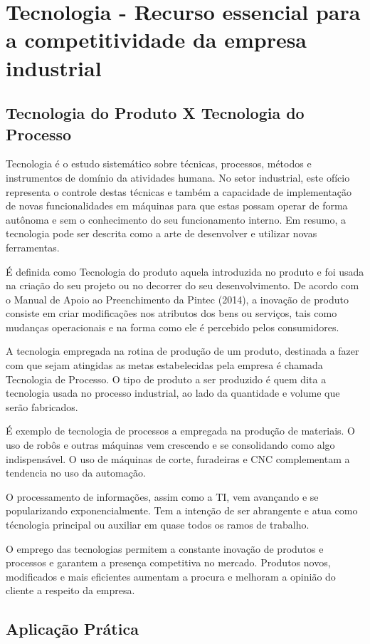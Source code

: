 \chapter{Tecnologia - Recurso essencial para a competitividade da empresa industrial} 
\label{chap:tecnologia_recurso} 

\section{Tecnologia do Produto X Tecnologia do Processo} 
\label{sec:tecnologia_prod_process} 
  Tecnologia é o estudo sistemático sobre técnicas, processos, métodos e instrumentos de domínio da atividades humana. No setor industrial, este ofício representa o controle destas técnicas e também a capacidade de implementação de novas funcionalidades em máquinas para que estas possam operar de forma autônoma e sem o conhecimento do seu funcionamento interno. Em resumo, a tecnologia pode ser descrita como a arte de desenvolver e utilizar novas ferramentas.

  É definida como Tecnologia do produto aquela introduzida no produto e foi usada na criação do seu projeto ou no decorrer do seu desenvolvimento. De acordo com o Manual de Apoio ao Preenchimento da Pintec (2014), a inovação de produto consiste em criar modificações nos atributos dos bens ou serviços, tais como mudanças operacionais e na forma como ele é percebido pelos consumidores.

  A tecnologia empregada na rotina de produção de um produto, destinada a fazer com que sejam atingidas as metas estabelecidas pela empresa é chamada Tecnologia de Processo. O tipo de produto a ser produzido é quem dita a tecnologia usada no processo industrial, ao lado da quantidade e volume que serão fabricados.

  É exemplo de tecnologia de processos a empregada na produção de materiais. O uso de robôs e outras máquinas vem crescendo e se consolidando como algo indispensável. O uso de máquinas de corte, furadeiras e CNC complementam a tendencia no uso da automação. 

  O processamento de informações, assim como a TI, vem avançando e se popularizando exponencialmente. Tem a intenção de ser abrangente e atua como técnologia principal ou auxiliar em quase todos os ramos de trabalho. 
  
  O emprego das tecnologias permitem a constante inovação de produtos e processos e garantem a presença competitiva no mercado. Produtos novos, modificados e mais eficientes aumentam a procura e melhoram a opinião do cliente a respeito da empresa.



 
 

\section{Aplicação Prática} 
\label{sec:tecnologia_recurso_aplicacao}